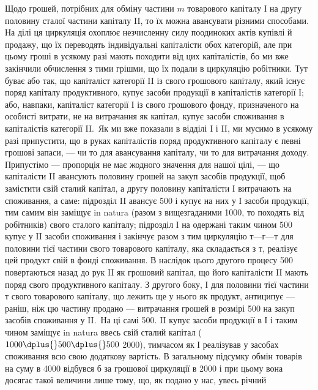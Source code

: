 Щодо грошей, потрібних для обміну частини $m$ товарового капіталу
І на другу половину сталої частини капіталу II, то їх можна авансувати
різними способами. На ділі ця циркуляція охоплює незчисленну силу поодиноких
актів купівлі й продажу, що їх переводять індивідуальні капіталісти
обох категорій, але при цьому гроші в усякому разі мають походити
від цих капіталістів, бо ми вже закінчили обчислення з тими
грішми, що їх подали в циркуляцію робітники. Тут буває або так, що
капіталіст категорії II із свого грошового капіталу, який існує поряд капіталу
продуктивного, купує засоби продукції в капіталістів категорії І;
або, навпаки, капіталіст категорії І із свого грошового фонду, призначеного
на особисті витрати, не на витрачання як капітал, купує засоби
споживання в капіталістів категорії II.~Як ми вже показали в відділі I і
II, ми мусимо в усякому разі припустити, що в руках капіталістів поряд
продуктивного капіталу є певні грошові запаси, — чи то для авансування
капіталу, чи то для витрачання доходу. Припустімо — пропорція не має
жодного значення для нашої цілі, — що капіталісти II авансують половину
грошей на закуп засобів продукції, щоб замістити свій сталий капітал,
а другу половину капіталісти І витрачають на споживання, а саме: підрозділ
II авансує 500 і купує на них у І засоби продукції,
тим самим він заміщує in natura (разом з вищезгаданими 1000,
то походять від робітників)  свого сталого капіталу; підрозділ І на
одержані таким чином 500 купує у II засоби споживання
і закінчує разом з тим циркуляцію $т — г — т$ для половини тієї частини
свого товарового капіталу, яка складається з $т$, реалізує цей продукт
свій в фонді споживання. В наслідок цього другого процесу 500
повертаються назад до рук II як грошовий капітал, що його капіталісти
II мають поряд свого продуктивного капіталу. З другого боку, І для
половини тієї частини $т$ свого товарового капіталу, що лежить ще у
нього як продукт, антиципує — раніш, ніж цю частину продано — витрачання
грошей в розмірі 500 на закуп засобів споживання у II.~На ці самі 500. II купує засоби продукції в І і таким чином
заміщує in natura ввесь свій сталий капітал ($1000 \dplus{} 500 \dplus{} 500$ \deq{} 2000),
тимчасом як І реалізував у засобах споживання всю свою додаткову
вартість. В загальному підсумку обмін товарів на суму в 4000
відбувся б за грошової циркуляції в 2000 і при цьому вона
досягає такої величини лише тому, що, як подано у нас, увесь річний

